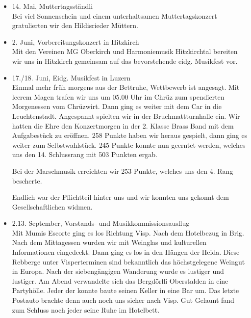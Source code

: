 \begin{history}
\begin{itemize}
        \item 14. Mai, Muttertagsständli\\
              Bei viel Sonnenschein und einem unterhaltsamen Muttertagskonzert
              gratulierten wir den Hildisrieder Müttern.

        \item 2. Juni, Vorbereitungskonzert in Hitzkirch\\
              Mit den Vereinen MG Oberkirch und Harmoniemusik Hitzkirchtal bereiten
              wir uns in Hitzkirch gemeinsam auf das bevorstehende eidg. Musikfest
              vor.

        \item 17./18. Juni, Eidg. Musikfest in Luzern\\
              Einmal mehr früh morgens aus der Bettruhe, Wettbewerb ist angesagt. Mit
              leerem Magen trafen wir uns um 05.00 Uhr im Chrüz zum spendierten
              Morgenessen vom Chrüzwirt. Dann ging es weiter mit dem Car in die
              Leuchtenstadt. Angespannt spielten wir in der Bruchmattturnhalle ein.
              Wir hatten die Ehre den Konzertmorgen in der 2. Klasse Brass Band mit
              dem Aufgabestück zu eröffnen. 258 Punkte haben wir heraus gespielt, dann
              ging es weiter zum Selbstwahlstück. 245 Punkte konnte nun geerntet
              werden, welches uns den 14. Schlussrang mit 503 Punkten ergab.

              Bei der Marschmusik erreichten wir 253 Punkte, welches uns den 4. Rang
              bescherte.

              Endlich war der Pflichtteil hinter uns und wir konnten uns gekonnt dem
              Gesellschaftlichen widmen.

        \item 2.13. September, Vorstands- und Musikkommissionsausflug\\
              Mit Mumis Escorte ging es los Richtung Visp. Nach dem Hotelbezug in
              Brig. Nach dem Mittagessen wurden wir mit Weinglas und kulturellen
              Informationen eingedeckt. Dann ging es los in den Hängen der Heida.
              Diese Rebberge unter Visperterminen sind bekanntlich das höchstgelegene
              Weingut in Europa. Nach der siebengängigen Wanderung wurde es lustiger
              und lustiger. Am Abend verwandelte sich das Bergdörfli Oberstalden in
              eine Partyhölle. Jeder der konnte baute seinen Keller in eine Bar um.
              Das letzte Postauto brachte denn auch noch uns sicher nach Visp. Gut
              Gelaunt fand zum Schluss noch jeder seine Ruhe im Hotelbett.


\end{itemize}
\end{history}
